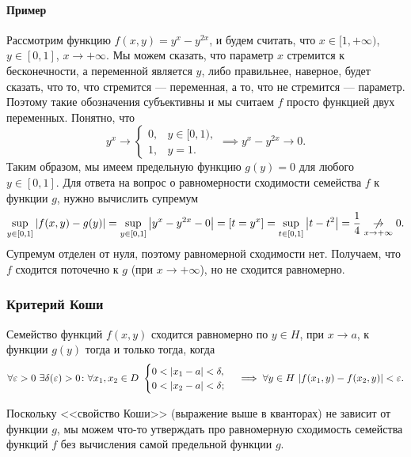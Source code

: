 \paragraph*{Пример}
Рассмотрим функцию $f(x, y) = y^{x} - y^{2x}$, и будем считать, что $x \in [1, +\infty)$, $y \in [0, 1]$, $x \to +\infty$.
Мы можем сказать, что параметр $x$ стремится к бесконечности, а переменной является $y$, либо правильнее, наверное, будет сказать, что то, что стремится --- переменная, а то, что не стремится --- параметр.
Поэтому такие обозначения субъективны и мы считаем $f$ просто функцией двух переменных.
Понятно, что
\[
    y^{x} \to \begin{cases}
        0, & y \in [0, 1), \\
        1, & y = 1.
    \end{cases} \implies y^{x} - y^{2x} \to 0.
\]
Таким образом, мы имеем предельную функцию $g(y) = 0$ для любого $y \in [0, 1]$.
Для ответа на вопрос о равномерности сходимости семейства $f$ к функции $g$, нужно вычислить супремум
\[
    \sup\limits_{y \in [0, 1]}\abs{f(x, y) - g(y)} = \sup\limits_{y \in [0, 1]}\abs{y^{x} - y^{2x} - 0} = [t = y^{x}] = \sup\limits_{t \in [0, 1]}\abs{t - t^{2}} = \frac{1}{4} \underset{x \to +\infty}{\centernot\to} 0.
\]
Супремум отделен от нуля, поэтому равномерной сходимости нет.
Получаем, что $f$ сходится поточечно к $g$ (при $x \to +\infty$), но не сходится равномерно.

\subsubsection{Критерий Коши}

\begin{theorem}
    Семейство функций $f(x, y)$ сходится равномерно по $y \in H$, при $x \to a$, к функции $g(y)$ тогда и только тогда, когда
    \[
        \forall \varepsilon > 0~ \exists \delta(\varepsilon) > 0 \colon \forall x_1, x_2 \in D ~ \begin{cases}
            0 < \abs{x_{1} - a} < \delta, \\
            0 < \abs{x_{2} - a} < \delta;
        \end{cases} \implies \forall y \in H ~ \abs{f(x_{1}, y) - f(x_{2}, y)} < \varepsilon.
    \]
\end{theorem}

Поскольку <<свойство Коши>> (выражение выше в кванторах) не зависит от функции $g$, мы можем что-то утверждать про равномерную сходимость семейства функций $f$ без вычисления самой предельной функции $g$.

